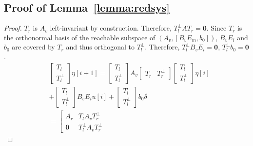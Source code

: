 




\subsection{Proof of Lemma~\ref{lemma:redsys}}
\begin{proof}
\(T_r\) is \(A_v\) left-invariant by construction. Therefore, \(T_l^\perp A T_r =\mathbf{0}\). 
Since \(T_r\) is the orthonormal basis of the reachable subspace of \((A_v,[B_v E_m,b_0])\), \(B_v E_i\) and \(b_0\) are covered by \(T_r\) and thus orthogonal to \(T_l^\perp\). Therefore, \(T_l^\perp B_v E_i =\mathbf{0}\), \(T_l^\perp b_0=\mathbf{0}\).
\begin{equation*}
\begin{split}
&\left[
\begin{array}{c}
    T_l  \\
    T_l^\perp 
\end{array}\right] \eta[i+1] = 
\left[
\begin{array}{c}
    T_l  \\
    T_l^\perp 
\end{array}\right] A_v \left[
\begin{array}{cc}
    T_r & T_r^\perp 
\end{array}\right] 
\left[
\begin{array}{c}
    T_l  \\
    T_l^\perp 
\end{array}\right]\eta[i] \\&+ \left[\begin{array}{c}
    T_l  \\
    T_l^\perp 
\end{array}\right]B_v E_i u[i] + \left[\begin{array}{c}
    T_l  \\
    T_l^\perp 
\end{array}\right] b_0 \delta \\
& = \left[
\begin{array}{cc}
    A_r & T_l A_v T_r^\perp \\
    \mathbf{0} & T_l^\perp A_v T_r^\perp

\end{array}
\end{split}
\end{equation*}
\end{proof}

